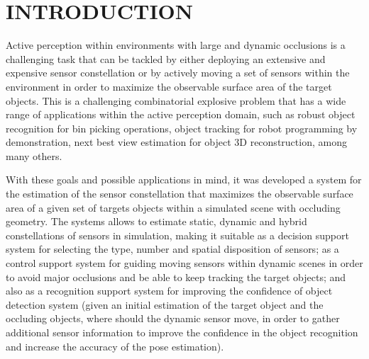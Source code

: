 \section{\uppercase{Introduction}}\label{sec:introduction}


\noindent Active perception within environments with large and dynamic occlusions is a challenging task that can be tackled by either deploying an extensive and expensive sensor constellation or by actively moving a set of sensors within the environment in order to maximize the observable surface area of the target objects. This is a challenging combinatorial explosive problem that has a wide range of applications within the active perception domain, such as robust object recognition for bin picking operations, object tracking for robot programming by demonstration, next best view estimation for object 3D reconstruction, among many others.

With these goals and possible applications in mind, it was developed a system for the estimation of the sensor constellation that maximizes the observable surface area of a given set of targets objects within a simulated scene with occluding geometry. The systems allows to estimate static, dynamic and hybrid constellations of sensors in simulation, making it suitable as a decision support system for selecting the type, number and spatial disposition of sensors; as a control support system for guiding moving sensors within dynamic scenes in order to avoid major occlusions and be able to keep tracking the target objects; and also as a recognition support system for improving the confidence of object detection system (given an initial estimation of the target object and the occluding objects, where should the dynamic sensor move, in order to gather additional sensor information to improve the confidence in the object recognition and increase the accuracy of the pose estimation).

